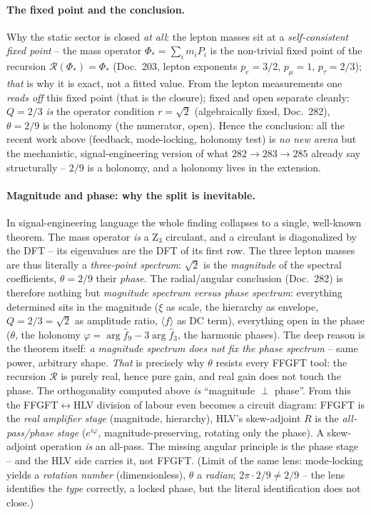 \paragraph{The fixed point and the conclusion.} Why the static sector is closed \emph{at all}: the
lepton masses sit at a \emph{self-consistent fixed point} -- the mass operator $\Phi_*=\sum_i m_i P_i$ is
the non-trivial fixed point of the recursion $\mathcal R(\Phi_*)=\Phi_*$ (Doc.~203, lepton exponents
$p_e=3/2,\,p_\mu=1,\,p_\tau=2/3$); \emph{that} is why it is exact, not a fitted value. From the lepton
measurements one \emph{reads off} this fixed point (that is the closure); fixed and open separate
cleanly: $Q=2/3$ \emph{is} the operator condition $r=\sqrt2$ (algebraically fixed, Doc.~282),
$\theta=2/9$ is the holonomy (the numerator, open). Hence the conclusion: all the recent work above
(feedback, mode-locking, holonomy test) is \emph{no new arena} but the mechanistic, signal-engineering
version of what $282\to283\to285$ already say structurally -- $2/9$ is a holonomy, and a holonomy lives
in the extension.

\paragraph{Magnitude and phase: why the split is inevitable.} In signal-engineering language the whole
finding collapses to a single, well-known theorem. The mass operator \emph{is} a Z$_3$ circulant, and a
circulant is diagonalized by the DFT -- its eigenvalues are the DFT of its first row. The three lepton
masses are thus literally a \emph{three-point spectrum}: $\sqrt2$ is the \emph{magnitude} of the
spectral coefficients, $\theta=2/9$ their \emph{phase}. The radial/angular conclusion (Doc.~282) is
therefore nothing but \emph{magnitude spectrum versus phase spectrum}: everything determined sits in the
magnitude ($\xi$ as scale, the hierarchy as envelope, $Q=2/3=\sqrt2$ as amplitude ratio, $\langle
f\rangle$ as DC term), everything open in the phase ($\theta$, the holonomy
$\varphi=\arg\hat f_9-3\arg\hat f_3$, the harmonic phases). The deep reason is the theorem itself:
\emph{a magnitude spectrum does not fix the phase spectrum} -- same power, arbitrary shape. \emph{That}
is precisely why $\theta$ resists every FFGFT tool: the recursion $\mathcal R$ is purely real, hence pure
gain, and real gain does not touch the phase. The orthogonality computed above \emph{is}
\enquote{magnitude $\perp$ phase}. From this the FFGFT$\leftrightarrow$HLV division of labour even
becomes a circuit diagram: FFGFT is the \emph{real amplifier stage} (magnitude, hierarchy), HLV's
skew-adjoint $R$ is the \emph{all-pass/phase stage} ($e^{i\varphi}$, magnitude-preserving, rotating only
the phase). A skew-adjoint operation \emph{is} an all-pass. The missing angular principle is the phase
stage -- and the HLV side carries it, not FFGFT. (Limit of the same lens: mode-locking yields a
\emph{rotation number} (dimensionless), $\theta$ a \emph{radian}; $2\pi\cdot2/9\neq2/9$ -- the lens
identifies the \emph{type} correctly, a locked phase, but the literal identification does not close.)

